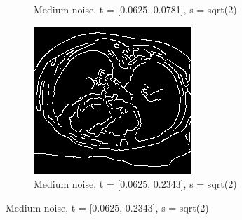 \begin{figure}[H]
\begin{subfigure}{.5\textwidth}
    \caption{Medium noise, t = [0.0625, 0.0781], s = sqrt(2)}
    \label{fig:m_noise_sens_h_thres}
  \end{subfigure}%
  \begin{subfigure}{.5\textwidth}
    \centering
    \includegraphics[width=.9\textwidth]{./edgedetection/canny_medium_noise/m_noise_insens_h_thres}
    \caption{Medium noise, t = [0.0625, 0.2343], s = sqrt(2)}
    \label{fig:m_noise_insens_h_thres}
  \end{subfigure}%
  
\end{figure}

